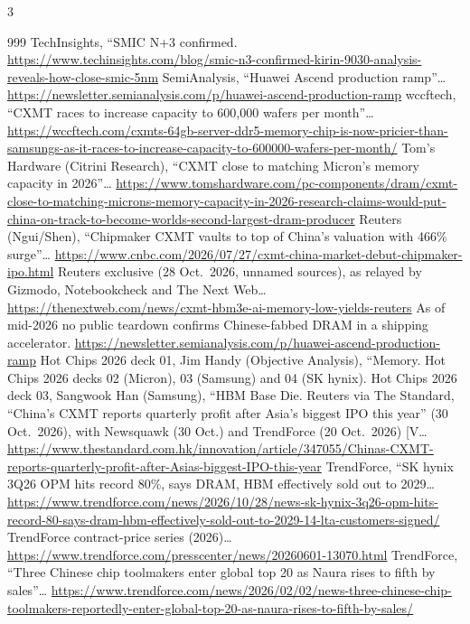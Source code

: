 \begin{multicols}{3}
\begin{thebibliography}{999}
 TechInsights, ``SMIC N+3 confirmed. \url{https://www.techinsights.com/blog/smic-n3-confirmed-kirin-9030-analysis-reveals-how-close-smic-5nm}
 SemiAnalysis, ``Huawei Ascend production ramp''… \url{https://newsletter.semianalysis.com/p/huawei-ascend-production-ramp}
 wccftech, ``CXMT races to increase capacity to 600,000 wafers per month''… \url{https://wccftech.com/cxmts-64gb-server-ddr5-memory-chip-is-now-pricier-than-samsungs-as-it-races-to-increase-capacity-to-600000-wafers-per-month/}
 Tom's Hardware (Citrini Research), ``CXMT close to matching Micron's memory capacity in 2026''… \url{https://www.tomshardware.com/pc-components/dram/cxmt-close-to-matching-microns-memory-capacity-in-2026-research-claims-would-put-china-on-track-to-become-worlds-second-largest-dram-producer}
 Reuters (Ngui/Shen), ``Chipmaker CXMT vaults to top of China's valuation with 466\% surge''… \url{https://www.cnbc.com/2026/07/27/cxmt-china-market-debut-chipmaker-ipo.html}
 Reuters exclusive (28 Oct.\ 2026, unnamed sources), as relayed by Gizmodo, Notebookcheck and The Next Web… \url{https://thenextweb.com/news/cxmt-hbm3e-ai-memory-low-yields-reuters}
 As of mid-2026 no public teardown confirms Chinese-fabbed DRAM in a shipping accelerator. \url{https://newsletter.semianalysis.com/p/huawei-ascend-production-ramp}
 Hot Chips 2026 deck 01, Jim Handy (Objective Analysis), ``Memory.
 Hot Chips 2026 decks 02 (Micron), 03 (Samsung) and 04 (SK hynix).
 Hot Chips 2026 deck 03, Sangwook Han (Samsung), ``HBM Base Die.
 Reuters via The Standard, ``China's CXMT reports quarterly profit after Asia's biggest IPO this year'' (30 Oct.\ 2026), with Newsquawk (30 Oct.) and TrendForce (20 Oct.\ 2026) [V… \url{https://www.thestandard.com.hk/innovation/article/347055/Chinas-CXMT-reports-quarterly-profit-after-Asias-biggest-IPO-this-year}
 TrendForce, ``SK hynix 3Q26 OPM hits record 80\%, says DRAM, HBM effectively sold out to 2029… \url{https://www.trendforce.com/news/2026/10/28/news-sk-hynix-3q26-opm-hits-record-80-says-dram-hbm-effectively-sold-out-to-2029-14-lta-customers-signed/}
 TrendForce contract-price series (2026)… \url{https://www.trendforce.com/presscenter/news/20260601-13070.html}
 TrendForce, ``Three Chinese chip toolmakers enter global top 20 as Naura rises to fifth by sales''… \url{https://www.trendforce.com/news/2026/02/02/news-three-chinese-chip-toolmakers-reportedly-enter-global-top-20-as-naura-rises-to-fifth-by-sales/}

\end{thebibliography}
\end{multicols}
